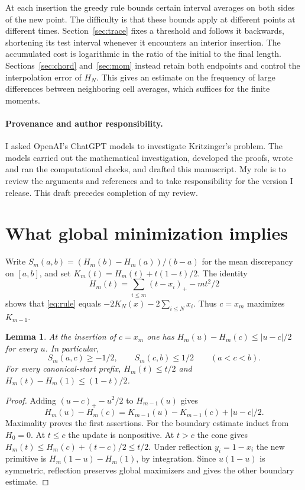 \documentclass[11pt,a4paper]{amsart}
\newtheorem{lemma}[theorem]{Lemma}
\begin{document}
At each insertion the greedy rule bounds certain interval averages
on both sides of the new point. The difficulty is that these bounds
apply at different points at different times. Section~\ref{sec:trace}
fixes a threshold and follows it backwards, shortening its test interval
whenever it encounters an interior insertion. The accumulated cost is
logarithmic in the ratio of the initial to the final length.
Sections~\ref{sec:chord} and~\ref{sec:mom} instead retain both endpoints
and control the interpolation error of $H_N$. This gives an estimate
on the frequency of large differences between neighboring cell averages,
which suffices for the finite moments.

\paragraph{Provenance and author responsibility.}
I asked OpenAI's ChatGPT models to investigate Kritzinger's problem.
The models carried out the mathematical investigation, developed the
proofs, wrote and ran the computational checks, and drafted this
manuscript. My role is to review the arguments and references and to
take responsibility for the version I release. This draft precedes
completion of my review.

\section{What global minimization implies}\label{sec:cone}
Write $S_m(a,b)=(H_m(b)-H_m(a))/(b-a)$ for the mean discrepancy on
$[a,b]$, and set $K_m(t)=H_m(t)+t(1-t)/2$. The identity
\[
 H_m(t)=\sum_{i\le m}(t-x_i)_+-mt^2/2
\]
shows that \eqref{eq:rule} equals $-2K_N(x)-2\sum_{i\le N}x_i$.
Thus $c=x_m$ maximizes $K_{m-1}$.

\begin{lemma}\label{lem:cone}
At the insertion of $c=x_m$ one has
$H_m(u)-H_m(c)\le |u-c|/2$ for every $u$. In particular,
\begin{equation}\label{eq:slopes}
 S_m(a,c)\ge-1/2,\qquad S_m(c,b)\le1/2\qquad(a<c<b).
\end{equation}
For every canonical-start prefix, $H_m(t)\le t/2$ and
$H_m(t)-H_m(1)\le(1-t)/2$.
\end{lemma}
\begin{proof}
Adding $(u-c)_+-u^2/2$ to $H_{m-1}(u)$ gives
\[
 H_m(u)-H_m(c)=K_{m-1}(u)-K_{m-1}(c)+|u-c|/2 .
\]
Maximality proves the first assertions. For the boundary estimate induct
from $H_0=0$. At $t\le c$ the update is nonpositive. At $t>c$ the cone
gives $H_m(t)\le H_m(c)+(t-c)/2\le t/2$. Under reflection $y_i=1-x_i$
the new primitive is $H_m(1-u)-H_m(1)$, by integration. Since $u(1-u)$
is symmetric, reflection preserves global maximizers and gives the other
boundary estimate.
\end{proof}
\end{document}
